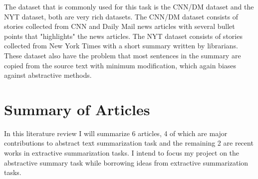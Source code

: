 \documentclass[11pt,a4paper]{article}
\begin{document}
The dataset that is commonly used for this task is the CNN/DM dataset and the NYT dataset, both are very rich datasets. The CNN/DM dataset consists of stories collected from CNN and Daily Mail news articles with several bullet points that "highlights" the news articles. The NYT dataset consists of stories collected from New York Times with a short summary written by librarians. These dataset also have the problem that most sentences in the summary are copied from the source text with minimum modification, which again biases against abstractive methods.
\section{Summary of Articles}
In this literature review I will summarize 6 articles, 4 of which are major contributions to abstract text summarization task and the remaining 2 are recent works in extractive summarization tasks. I intend to focus my project on the abstractive summary task while borrowing ideas from extractive summarization tasks.
\end{document}
